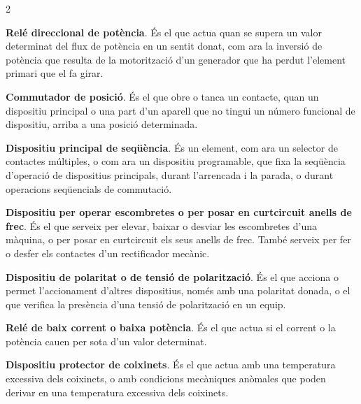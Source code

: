 \begin{multicols}{2}
\begin{list}{}
		\item[\textbf{32}]  
		\textbf{Relé direccional de potència}. És el que actua quan se supera un valor determinat del
		flux de potència en un sentit donat, com ara la inversió de potència que resulta de la motorització d'un generador que ha perdut l'element primari que el fa girar.
		
		\item[\textbf{33}]  
		\textbf{Commutador de posició}. És el que
		obre o tanca un contacte, quan un dispositiu principal o una part d'un aparell que no tingui un número funcional de dispositiu, arriba a una posició determinada.
		
		\item[\textbf{34}]  
		\textbf{Dispositiu principal de  seqüència}. És un element, com ara un selector de contactes múltiples, o com ara un
		dispositiu programable,
		que fixa la seqüència d'operació
		de dispositius principals, durant l'arrencada i la parada, o durant  operacions seqüencials de commutació.
		
		
		\item[\textbf{35}]   
		\textbf{Dispositiu per operar escombretes o per posar en curtcircuit anells de frec}. És el que serveix per elevar, baixar o
		desviar les escombretes d'una màquina, o per posar en curtcircuit
		els seus anells de frec. També serveix per fer o desfer els
		contactes d'un rectificador mecànic.
		
		\item[\textbf{36}] 
		 
		\textbf{Dispositiu de polaritat o de tensió de polarització}. És el que acciona o permet
		l'accionament d'altres dispositius, només amb una polaritat
		donada, o el que verifica la presència d'una tensió de polarització
		en un equip.
		
		\item[\textbf{37}] 
		\textbf{Relé de baix corrent o baixa potència}. És el que actua si el corrent o la potència cauen per
		sota d'un valor determinat.
		
		\item[\textbf{38}] 
		\textbf{Dispositiu protector de coixinets}. És el que actua amb una
		temperatura excessiva dels coixinets, o amb condicions mecàniques
		anòmales que poden derivar en una temperatura excessiva dels
		coixinets.
		

\end{list}
\end{multicols}
